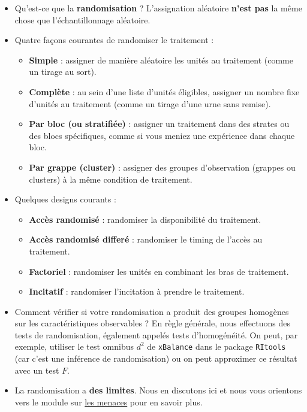 \documentclass[
  12pt,
]{book}
\begin{document}
\begin{itemize}
\item
  Qu'est-ce que la \textbf{randomisation} ? L'assignation aléatoire \textbf{n'est pas} la même chose que l'échantillonnage aléatoire.
\item
  Quatre façons courantes de randomiser le traitement :

  \begin{itemize}
  \item
    \textbf{Simple} : assigner de manière aléatoire les unités au traitement (comme un tirage au sort).
  \item
    \textbf{Complète} : au sein d'une liste d'unités éligibles, assigner un nombre fixe d'unités au traitement (comme un tirage d'une urne sans remise).
  \item
    \textbf{Par bloc (ou stratifiée)} : assigner un traitement dans des strates ou des blocs spécifiques, comme si vous meniez une expérience dans chaque bloc.
  \item
    \textbf{Par grappe (cluster)} : assigner des groupes d'observation (grappes ou clusters) à la même condition de traitement.
  \end{itemize}
\item
  Quelques designs courants :

  \begin{itemize}
  \item
    \textbf{Accès randomisé} : randomiser la disponibilité du traitement.
  \item
    \textbf{Accès randomisé differé} : randomiser le timing de l'accès au traitement.
  \item
    \textbf{Factoriel} : randomiser les unités en combinant les bras de traitement.
  \item
    \textbf{Incitatif} : randomiser l'incitation à prendre le traitement.
  \end{itemize}
\item
  Comment vérifier si votre randomisation a produit des groupes homogènes sur les caractéristiques observables ? En règle générale, nous effectuons des tests de randomisation, également appelés tests d'homogénéité. On peut, par exemple, utiliser le test omnibus \(d^2\) de \texttt{xBalance} dans le package \texttt{RItools} (car c'est une inférence de randomisation) ou on peut approximer ce résultat avec un test \(F\).
\item
  La randomisation a \textbf{des limites}. Nous en discutons ici et nous vous orientons vers le module sur \href{threats-to-internal-validity-of-randomized-experiments.html}{les menaces} pour en savoir plus.
\end{itemize}
\end{document}
